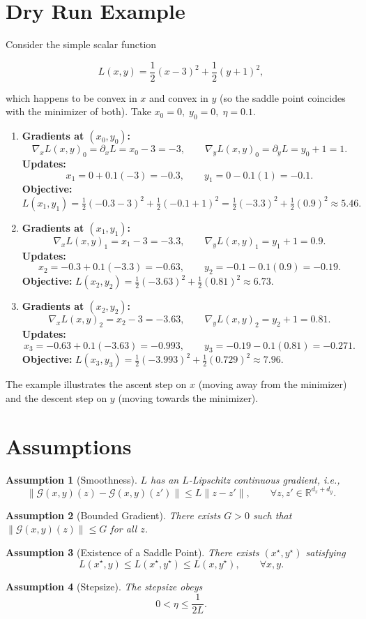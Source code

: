 \documentclass{article}
\newtheorem{assumption}{Assumption}
\newcommand{\gradx}{\nabla_{x} L(x,y)}
\newcommand{\grady}{\nabla_{y} L(x,y)}
\newcommand{\G}{\mathcal{G}(x,y)}
\begin{document}
\section*{Dry Run Example}
Consider the simple scalar function  

\[
L(x,y)=\frac12 (x-3)^2+\frac12 (y+1)^2,
\]

which happens to be convex in \(x\) and convex in \(y\) (so the saddle point coincides with the minimizer of both).  
Take \(x_0=0,\;y_0=0,\;\eta=0.1\).  

\begin{enumerate}[label=Iteration \arabic*:, leftmargin=*]
\item \textbf{Gradients at \((x_0,y_0)\):}
\[
\gradx_0=\partial_x L= x_0-3=-3,\qquad
\grady_0=\partial_y L= y_0+1=1.
\]
\textbf{Updates:}
\[
x_1=0+0.1(-3)=-0.3,\qquad
y_1=0-0.1(1)=-0.1.
\]
\textbf{Objective:}
\(L(x_1,y_1)=\tfrac12(-0.3-3)^2+\tfrac12(-0.1+1)^2= \tfrac12( -3.3)^2+\tfrac12(0.9)^2\approx5.46.\)

\item \textbf{Gradients at \((x_1,y_1)\):}
\[
\gradx_1=x_1-3=-3.3,\qquad
\grady_1=y_1+1=0.9.
\]
\textbf{Updates:}
\[
x_2=-0.3+0.1(-3.3)=-0.63,\qquad
y_2=-0.1-0.1(0.9)=-0.19.
\]
\textbf{Objective:}
\(L(x_2,y_2)=\tfrac12(-3.63)^2+\tfrac12(0.81)^2\approx6.73.\)

\item \textbf{Gradients at \((x_2,y_2)\):}
\[
\gradx_2=x_2-3=-3.63,\qquad
\grady_2=y_2+1=0.81.
\]
\textbf{Updates:}
\[
x_3=-0.63+0.1(-3.63)=-0.993,\qquad
y_3=-0.19-0.1(0.81)=-0.271.
\]
\textbf{Objective:}
\(L(x_3,y_3)=\tfrac12(-3.993)^2+\tfrac12(0.729)^2\approx7.96.\)
\end{enumerate}
The example illustrates the ascent step on \(x\) (moving away from the minimizer) and the descent step on \(y\) (moving towards the minimizer).

\newpage
\section*{Assumptions}
\begin{assumption}[Smoothness]\label{ass:smooth}
\(L\) has an \(L\)-Lipschitz continuous gradient, i.e.,
\[
\|\G(z)-\G(z')\|\le L\|z-z'\|,\qquad\forall z,z'\in\mathbb{R}^{d_x+d_y}.
\]
\end{assumption}
\begin{assumption}[Bounded Gradient]\label{ass:bound}
There exists \(G>0\) such that \(\|\G(z)\|\le G\) for all \(z\).
\end{assumption}
\begin{assumption}[Existence of a Saddle Point]\label{ass:saddle}
There exists \((x^{\star},y^{\star})\) satisfying
\[
L(x^{\star},y)\le L(x^{\star},y^{\star})\le L(x,y^{\star}),\qquad\forall x,y.
\]
\end{assumption}
\begin{assumption}[Stepsize]\label{ass:stepsize}
The stepsize obeys 
\[
0<\eta\le \frac{1}{2L}.
\]
\end{assumption}
\end{document}

